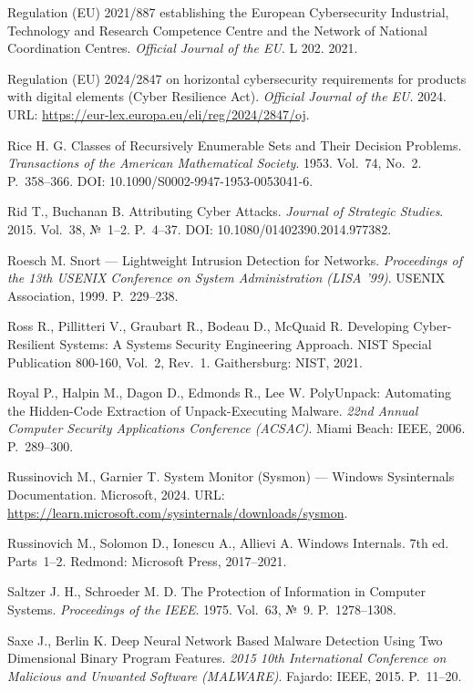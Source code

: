  Regulation (EU) 2021/887 establishing the European Cybersecurity Industrial, Technology and Research Competence Centre and the Network of National Coordination Centres. \emph{Official Journal of the EU}. L 202. 2021.

 Regulation (EU) 2024/2847 on horizontal cybersecurity requirements for products with digital elements (Cyber Resilience Act). \emph{Official Journal of the EU}. 2024. URL: \url{https://eur-lex.europa.eu/eli/reg/2024/2847/oj}.

 Rice H. G. Classes of Recursively Enumerable Sets and Their Decision Problems. \emph{Transactions of the American Mathematical Society}. 1953. Vol.~74, No.~2. P.~358--366. DOI: 10.1090/S0002-9947-1953-0053041-6.

 Rid T., Buchanan B. Attributing Cyber Attacks. \emph{Journal of Strategic Studies}. 2015. Vol.~38, №~1--2. P.~4--37. DOI: 10.1080/01402390.2014.977382.

 Roesch M. Snort --- Lightweight Intrusion Detection for Networks. \emph{Proceedings of the 13th USENIX Conference on System Administration (LISA '99)}. USENIX Association, 1999. P.~229--238.

 Ross R., Pillitteri V., Graubart R., Bodeau D., McQuaid R. Developing Cyber-Resilient Systems: A Systems Security Engineering Approach. NIST Special Publication 800-160, Vol.~2, Rev.~1. Gaithersburg: NIST, 2021.

 Royal P., Halpin M., Dagon D., Edmonds R., Lee W. PolyUnpack: Automating the Hidden-Code Extraction of Unpack-Executing Malware. \emph{22nd Annual Computer Security Applications Conference (ACSAC)}. Miami Beach: IEEE, 2006. P.~289--300.

 Russinovich M., Garnier T. System Monitor (Sysmon) --- Windows Sysinternals Documentation. Microsoft, 2024. URL: \url{https://learn.microsoft.com/sysinternals/downloads/sysmon}.

 Russinovich M., Solomon D., Ionescu A., Allievi A. Windows Internals. 7th ed. Parts~1--2. Redmond: Microsoft Press, 2017--2021.

 Saltzer J. H., Schroeder M. D. The Protection of Information in Computer Systems. \emph{Proceedings of the IEEE}. 1975. Vol.~63, №~9. P.~1278--1308.

 Saxe J., Berlin K. Deep Neural Network Based Malware Detection Using Two Dimensional Binary Program Features. \emph{2015 10th International Conference on Malicious and Unwanted Software (MALWARE)}. Fajardo: IEEE, 2015. P.~11--20.

